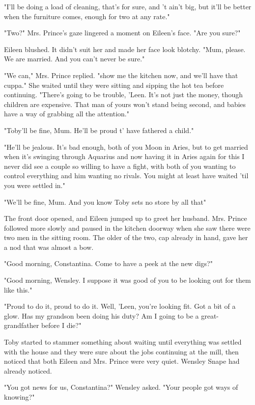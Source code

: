 "I'll be doing a load of cleaning, that's for sure, and 't ain't big, but it'll be better when the furniture comes, enough for two at any rate."

"Two?" Mrs. Prince's gaze lingered a moment on Eileen's face. "Are you sure?"

Eileen blushed. It didn't suit her and made her face look blotchy. "Mum, please. We are married. And you can't never be sure."

"We can," Mrs. Prince replied. "show me the kitchen now, and we'll have that cuppa." She waited until they were sitting and sipping the hot tea before continuing. "There's going to be trouble, 'Leen. It's not just the money, though children are expensive. That man of yours won't stand being second, and babies have a way of grabbing all the attention."

"Toby'll be fine, Mum. He'll be proud t' have fathered a child."

"He'll be jealous. It's bad enough, both of you Moon in Aries, but to get married when it's swinging through Aquarius and now having it in Aries again for this{\el} I never did see a couple so willing to have a fight, with both of you wanting to control everything and him wanting no rivals. You might at least have waited 'til you were settled in."

"We'll be fine, Mum. And you know Toby sets no store by all that{\el}"

The front door opened, and Eileen jumped up to greet her husband. Mrs. Prince followed more slowly and paused in the kitchen doorway when she saw there were two men in the sitting room. The older of the two, cap already in hand, gave her a nod that was almost a bow.

"Good morning, Constantina. Come to have a peek at the new digs?"

"Good morning, Wensley. I suppose it was good of you to be looking out for them like this."

"Proud to do it, proud to do it. Well, 'Leen, you're looking fit. Got a bit of a glow. Has my grandson been doing his duty? Am I going to be a great-grandfather before I die?"

Toby started to stammer something about waiting until everything was settled with the house and they were sure about the jobs continuing at the mill, then noticed that both Eileen and Mrs. Prince were very quiet. Wensley Snape had already noticed.

"You got news for us, Constantina?" Wensley asked. "Your people got ways of knowing?"

